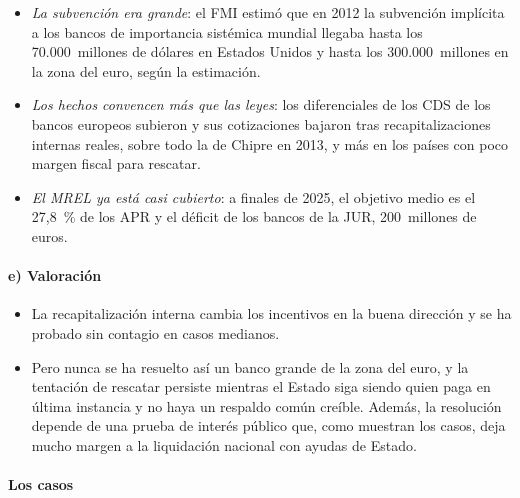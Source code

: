 \documentclass[11pt]{article}
\begin{document}
\begin{itemize}
\item \emph{La subvención era grande}: el FMI estimó que en 2012 la subvención implícita a los bancos de importancia sistémica mundial llegaba hasta los 70.000~millones de dólares en Estados Unidos y hasta los 300.000~millones en la zona del euro, según la estimación\nocite{FMI2014Subsidio}.
\item \emph{Los hechos convencen más que las leyes}: los diferenciales de los CDS de los bancos europeos subieron y sus cotizaciones bajaron tras recapitalizaciones internas reales, sobre todo la de Chipre en 2013, y más en los países con poco margen fiscal para rescatar\nocite{SchaferSchnabelWeder2016}.
\item \emph{El MREL ya está casi cubierto}: a finales de 2025, el objetivo medio es el 27,8~\% de los APR y el déficit de los bancos de la JUR, 200~millones de euros\nocite{SRB2026MREL}.
\end{itemize}

\paragraph{e) Valoración}

\begin{itemize}
\item La recapitalización interna cambia los incentivos en la buena dirección y se ha probado sin contagio en casos medianos.
\item Pero nunca se ha resuelto así un banco grande de la zona del euro, y la tentación de rescatar persiste mientras el Estado siga siendo quien paga en última instancia y no haya un respaldo común creíble. Además, la resolución depende de una prueba de interés público que, como muestran los casos, deja mucho margen a la liquidación nacional con ayudas de Estado.
\end{itemize}

\paragraph{Los casos}
\end{document}
